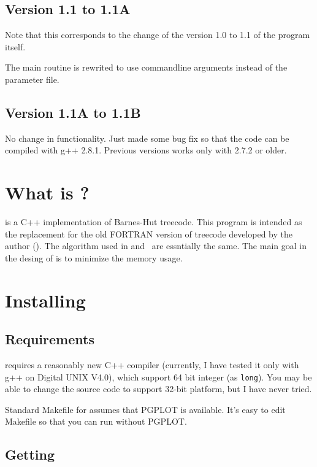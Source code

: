 \subsection{Version 1.1 to 1.1A}

Note that this corresponds to the change of the version 1.0 to 1.1 of
the program itself.

The main routine is rewrited to use commandline arguments instead of
the parameter file.

\subsection{Version 1.1A to 1.1B}

No change in functionality. Just made some bug fix so that the code
can be compiled with g++ 2.8.1. Previous versions works only with
2.7.2 or older. 

\section{What is \nbody ?}

\nbody is a C++ implementation of Barnes-Hut treecode. This program is
intended as the replacement for the old FORTRAN version of treecode
developed by the author (\vcode). The algorithm used in \nbody and
\vcode\ are essntially the same. The main goal in the desing of \nbody 
is to minimize the memory usage.

\section{Installing \nbody}

\subsection{Requirements}

\nbody requires a reasonably new C++ compiler (currently, I have
tested it only with g++ on Digital UNIX V4.0), which support 64 bit
integer (as {\tt long}). You may be able to change the source code to
support 32-bit platform, but I have never tried.

Standard Makefile for \nbody assumes that PGPLOT is available. It's
easy to edit Makefile so that you can run \nbody without PGPLOT.

\subsection{Getting \nbody}

